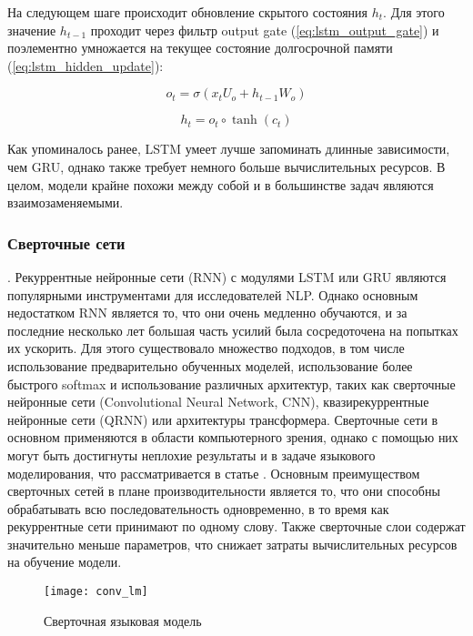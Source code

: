 На следующем шаге происходит обновление скрытого состояния $h_t$. Для этого значение $h_{t-1}$ проходит через фильтр output gate (\ref{eq:lstm_output_gate}) и поэлементно умножается на текущее состояние долгосрочной памяти (\ref{eq:lstm_hidden_update}):

\begin{equation}
	o_t = \sigma(x_tU_o + h_{t-1}W_o)
	\label{eq:lstm_output_gate}
\end{equation}

\begin{equation}
	h_t = o_t \circ \tanh{(c_t)}
	\label{eq:lstm_hidden_update}
\end{equation}

Как упоминалось ранее, LSTM умеет лучше запоминать длинные зависимости, чем GRU, однако также требует немного больше вычислительных ресурсов. В целом, модели крайне похожи между собой и в большинстве задач являются взаимозаменяемыми.

\subsubsection{Сверточные сети}. Рекуррентные нейронные сети (RNN) с модулями LSTM или GRU являются популярными инструментами для исследователей NLP. Однако основным недостатком RNN является то, что они очень медленно обучаются, и за последние несколько лет большая часть усилий была сосредоточена на попытках их ускорить. Для этого существовало множество подходов, в том числе использование предварительно обученных моделей, использование более быстрого softmax и использование различных архитектур, таких как сверточные нейронные сети (Convolutional Neural Network, CNN), квазирекуррентные нейронные сети (QRNN) или архитектуры трансформера. Сверточные сети в основном применяются в области компьютерного зрения, однако с помощью них могут быть достигнуты неплохие результаты и в задаче языкового моделирования, что рассматривается в статье \cite{conv_lm_paper}. Основным преимуществом сверточных сетей в плане производительности является то, что они способны обрабатывать всю последовательность одновременно, в то время как рекуррентные сети принимают по одному слову. Также сверточные слои содержат значительно меньше параметров, что снижает затраты вычислительных ресурсов на обучение модели.

\begin{figure}[ht]
	\centering
	\texttt{[image: conv\_lm]}  
	\caption{ Сверточная языковая модель \cite{conv_lm_paper} }
	\label{fig:lstm}
\end{figure}




